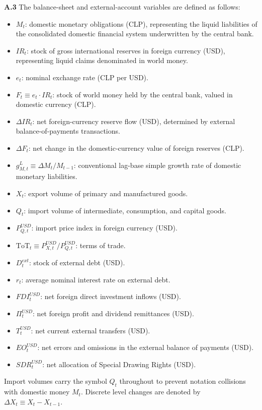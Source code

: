 \textbf{A.3} The balance-sheet and external-account variables are defined as follows:
\begin{itemize}[leftmargin=2em]
	\item $M_t$: domestic monetary obligations (CLP), representing the liquid liabilities of the consolidated domestic financial system underwritten by the central bank.
	\item $IR_t$: stock of gross international reserves in foreign currency (USD), representing liquid claims denominated in world money.
	\item $e_t$: nominal exchange rate (CLP per USD).
	\item $F_t \equiv e_t \cdot IR_t$: stock of world money held by the central bank, valued in domestic currency (CLP).
	\item $\Delta IR_t$: net foreign-currency reserve flow (USD), determined by external balance-of-payments transactions.
	\item $\Delta F_t$: net change in the domestic-currency value of foreign reserves (CLP).
	\item $g^L_{M,t} \equiv \Delta M_t / M_{t-1}$: conventional lag-base simple growth rate of domestic monetary liabilities.
	\item $X_t$: export volume of primary and manufactured goods.
	\item $Q_t$: import volume of intermediate, consumption, and capital goods.
	\item $P_{Q,t}^{USD}$: import price index in foreign currency (USD).
	\item $\text{ToT}_t \equiv P_{X,t}^{USD} / P_{Q,t}^{USD}$: terms of trade.
	\item $D_t^{ext}$: stock of external debt (USD).
	\item $r_t$: average nominal interest rate on external debt.
	\item $FDI_t^{USD}$: net foreign direct investment inflows (USD).
	\item $\Pi_t^{USD}$: net foreign profit and dividend remittances (USD).
	\item $T_t^{USD}$: net current external transfers (USD).
	\item $EO_t^{USD}$: net errors and omissions in the external balance of payments (USD).
	\item $SDR_t^{USD}$: net allocation of Special Drawing Rights (USD).
\end{itemize}

Import volumes carry the symbol $Q_t$ throughout to prevent notation collisions with domestic money $M_t$. Discrete level changes are denoted by $\Delta X_t \equiv X_t - X_{t-1}$.

